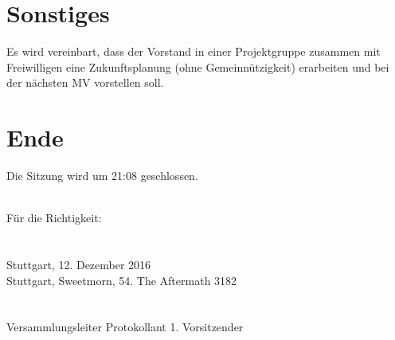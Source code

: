 \documentclass[a4paper]{scrartcl}
\begin{document}
\section{Sonstiges}
Es wird vereinbart, dass der Vorstand in einer Projektgruppe zusammen mit Freiwilligen eine Zukunftsplanung (ohne Gemeinnützigkeit) erarbeiten und bei der nächsten MV vorstellen soll.
\\
\section{Ende}

Die  Sitzung wird um 21:08 geschlossen.

\vfill
\mbox{}\\
Für die Richtigkeit:\\
\\
\\
Stuttgart, 12. Dezember 2016\\
Stuttgart, Sweetmorn, 54. The Aftermath 3182\\
\\
\\
\hfill Versammlungsleiter  \hfill Protokollant \hfill 1. Vorsitzender \hfill
\end{document}
